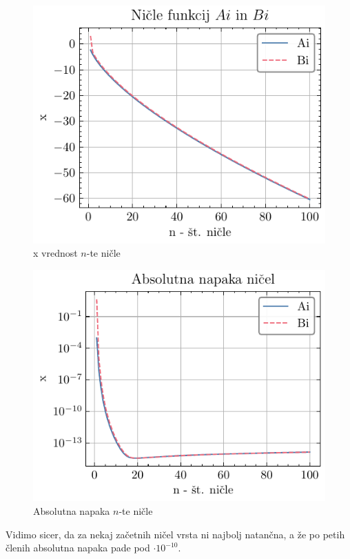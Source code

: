 \documentclass[slovene,11pt,a4paper]{article}
\newcommand{\ee}[1]{\cdot 10^{#1}}
\begin{document}
\begin{figure}[ht]
\begin{center}
  \includegraphics[width=13cm]{graphs/nicle_draw.pdf}
  \caption{x vrednost $n$-te ničle}
  \label{nicle draw}
\end{center}
\end{figure}


\begin{figure}[ht]
\begin{center}
  \includegraphics[width=13cm]{graphs/nicle_err.pdf}
  \caption{Absolutna napaka $n$-te ničle}
  \label{nicle err}
\end{center}
\end{figure}
Vidimo sicer, da za nekaj začetnih ničel vrsta ni najbolj natančna, a že po petih členih absolutna napaka pade pod $\ee{-10}$.
\end{document}
